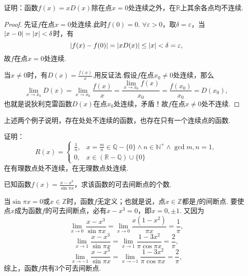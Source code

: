 \begin{example}
证明：函数\(f(x) = x D(x)\)除在点\(x = 0\)处连续之外，在\(\mathbb{R}\)上其余各点均不连续.
\begin{proof}
先证\(f\)在点\(x = 0\)处连续.此时\(f(0) = 0\).
\(\forall \varepsilon > 0\)，取\(\delta = \varepsilon\)，当\(\abs{x - 0} = \abs{x} < \delta\)时，有\[
\abs{f(x) - f(0)}
= \abs{ x D(x) }
\leq \abs{x} < \delta = \varepsilon,
\]故\(f\)在点\(x = 0\)处连续.

当\(x \neq 0\)时，有\(D(x) = \frac{f(x)}{x}\).用反证法.假设\(f\)在点\(x_0 \neq 0\)处连续，那么\[
\lim\limits_{x \to x_0} D(x) = \lim\limits_{x \to x_0} \frac{f(x)}{x}
= \frac{ \lim\limits_{x \to x_0} f(x) }{x_0}
= \frac{f(x_0)}{x_0} = D(x_0),
\]也就是说狄利克雷函数\(D(x)\)在点\(x_0\)处连续，矛盾！故\(f\)在点\(x \neq 0\)处不连续.
\end{proof}
\end{example}

上述两个例子说明，存在处处不连续的函数，也存在只有一个连续点的函数.

\begin{example}
证明：\[
	R(x) = \left\{ \begin{array}{cl}
		\frac{1}{n},
			& x=\frac{m}{n}\in\mathbb{Q}-\{0\}
				\land n\in\mathbb{N}^+
				\land \gcd{m,n}=1, \\
		0, & x\in(\mathbb{R}-\mathbb{Q})\cup\{0\}
	\end{array} \right.
\]在有理数点处不连续，在无理数点处连续.
\end{example}

\begin{example}
已知函数\(f(x) = \frac{x-x^3}{\sin \pi x}\)，求该函数的可去间断点的个数.
\begin{solution}
当\(\sin \pi x = 0\)或\(x \in \mathbb{Z}\)时，函数\(f\)无定义；也就是说，点\(x\in\mathbb{Z}\)都是\(f\)的间断点.
要使点\(x\)成为函数\(f\)的可去间断点，必有\(x-x^3=0\)，即\(x=0,\pm1\).
\def\l#1{\lim\limits_{x\to#1}}%
又因为\[
\l{0} \frac{x-x^3}{\sin \pi x}
= \l{0} \frac{x(1-x^2)}{\pi x}
= \frac{1}{\pi},
\]\[
\l{1} \frac{x-x^3}{\sin \pi x}
= \l{1} \frac{1-3x^2}{\pi \cos \pi x}
= \frac{2}{\pi},
\]\[
\l{-1} \frac{x-x^3}{\sin \pi x}
= \l{-1} \frac{1-3x^2}{\pi \cos \pi x}
= \frac{2}{\pi},
\]综上，函数\(f\)共有3个可去间断点.
\end{solution}
\end{example}

